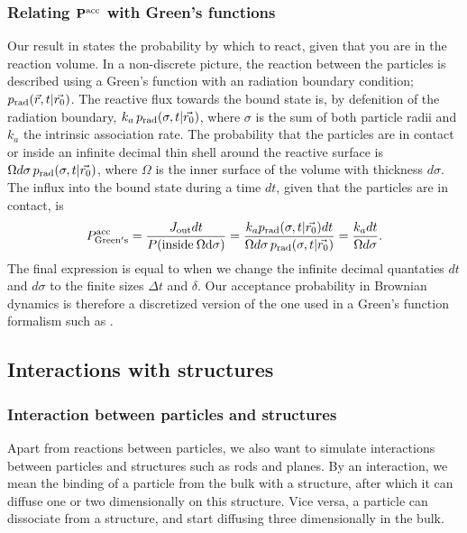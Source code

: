 \subsubsection{Relating $\mathbf{ P^{\rm acc}}$ with Green's functions}
Our result in  states the probability by which to react, given that you are in the reaction volume. In a non-discrete picture, the reaction between the particles is described using a Green's function with an radiation boundary condition; $p_{\rm rad}(\vec{r},t|\vec{r_0})$. The reactive flux towards the bound state is, by defenition of the radiation boundary, $k_a \, p_{\rm rad}(\sigma,t|\vec{r_0})$, where $\sigma$ is the sum of both particle radii and $k_a$ the intrinsic association rate. The probability that the particles are in contact or inside an infinite decimal thin shell around the reactive surface is $\Omega d\sigma \, p_{\rm rad}(\sigma,t|\vec{r_0})$, where $\Omega$ is the inner surface of the volume with thickness $d\sigma$. The influx into the bound state during a time $dt$, given that the particles are in contact, is \cite{Becker2011}
\begin{equation}
 P^{\rm acc}_{\rm Green's} = \frac{J_{\rm out}dt}{P({\rm inside\:\Omega d\sigma})} = \frac{k_a p_{\rm rad}(\sigma,t|\vec{r_0})dt}{\Omega d\sigma \, p_{\rm rad}(\sigma,t|\vec{r_0})} = \frac{k_a dt}{\Omega d\sigma}.
 \elabel{GFvsBD}
\end{equation}
The final expression is equal to  when we change the infinite decimal quantaties $dt$ and $d\sigma$ to the finite sizes $\Delta t$ and $\delta$. Our acceptance probability in Brownian dynamics is therefore a discretized version of the one used in a Green's function formalism such as \GFRD. 

\subsection{Interactions with structures}

\subsubsection{Interaction between particles and structures}
Apart from reactions between particles, we also want to simulate interactions between particles and structures such as rods and planes. By an interaction, we mean the binding of a particle from the bulk with a structure, after which it can diffuse one or two dimensionally on this structure. Vice versa, a particle can dissociate from a structure, and start diffusing three dimensionally in the bulk.

